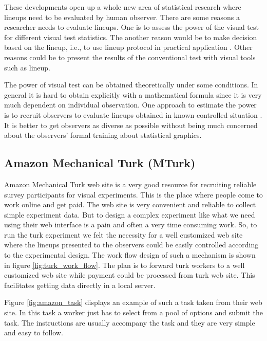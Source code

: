 \documentclass[11pt]{article}
\begin{document}
These developments open up a whole new area of statistical research where lineups need to be evaluated by human observer. There are some reasons a researcher needs to evaluate lineups. One is to assess the power of the visual test \cite{heike:2012} for different visual test statistics. The another reason would be to make decision based on the lineup, i.e., to use lineup protocol in practical application \cite{niladri:2012}. Other reasons could be to present the results of the conventional test with visual tools such as lineup.  




The power of visual test can be obtained theoretically \cite{majumder:2013} under some conditions. In general it is hard to obtain explicitly with a mathematical formula since it is very much dependent on individual observation. One approach to estimate the power is to recruit observers to evaluate lineups obtained in known controlled situation \cite{majumder:2013}. It is better to get observers as diverse as possible without being much concerned about the observers' formal training about statistical graphics.



\subsection{Amazon Mechanical Turk (MTurk)}

Amazon Mechanical Turk web site \cite{turk} is a very good resource for recruiting reliable survey participants for visual experiments. This is the place where people come to work online and get paid. The web site is very convenient and reliable to collect simple experiment data. But to design a complex experiment like what we need using their web interface is a pain and often a very time consuming work. So, to run the turk experiment we felt the necessity for a well customized web site where the lineups presented to the observers could be easily controlled according to the experimental design. The work flow design of such a mechanism is shown in figure \ref{fig:turk_work_flow}. The plan is to forward turk workers to a well customized web site while payment could be processed from turk web site. This facilitates getting data directly in a local server.

Figure \ref{fig:amazon_task} displays an example of such a task taken from their web site. In this task a worker just has to select from a pool of options and submit the task. The instructions are usually accompany the task and they are very simple and easy to follow. 
\end{document}
